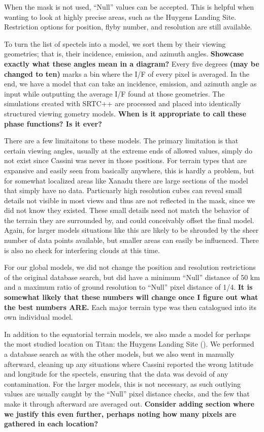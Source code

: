 \documentclass[twocolumn,linenumbers]{aastex631}
\begin{document}
When the mask is not used, ``Null'' values can be accepted. This is helpful when wanting to look at highly precise areas, such as the Huygens Landing Site. Restriction options for position, flyby number, and resolution are still available.

To turn the list of spectels into a model, we sort them by their viewing geometries; that is, their incidence, emission, and azimuth angles.  \textbf{\color{red}Showcase exactly what these angles mean in a diagram?\color{black}} Every five degrees \textbf{\color{red}(may be changed to ten)\color{black}} marks a bin where the I/F of every pixel is averaged. In the end, we have a model that can take an incidence, emission, and azimuth angle as input while outputting the average I/F found at those geometries. The simulations created with SRTC++ are processed and placed into identically structured viewing gometry models.  \textbf{\color{red}When is it appropriate to call these phase functions? Is it ever?\color{black}} 

There are a few limitaitons to these models. The primary limitation is that certain viewing angles, usually at the extreme ends of allowed values, simply do not exist since Cassini was never in those positions. For terrain types that are expansive and easily seen from basically anywhere, this is hardly a problem, but for somewhat localized areas like Xanadu there are large sections of the model that simply have no data. Particuarly high resolution cubes can reveal small details not visible in most views and thus are not reflected in the mask, since we did not know they existed. These small details need not match the behavior of the terrain they are surrounded by, and could conceivably offset the final model. Again, for larger models situations like this are likely to be shrouded by the sheer number of data points available, but smaller areas can easily be influenced. There is also no check for interfering clouds at this time. 

For our global models, we did not change the position and resolution restrictions of the original database search, but did have a minimum ``Null'' distance of 50 km and a maximum ratio of ground resolution to ``Null'' pixel distance of 1/4. \textbf{\color{red}It is somewhat likely that these numbers will change once I figure out what the best numbers ARE.\color{black}}  Each major terrain type was then catalogued into its own individual model. 

In addition to the equatorial terrain models, we also made a model for perhaps the most studied location on Titan: the Huygens Landing Site (). We performed a database search as with the other models, but we also went in manually afterward, cleaning up any situations where Cassini reported the wrong latitude and longitude for the spectels, ensuring that the data was devoid of any contamination. For the larger models, this is not necessary, as such outlying values are usually caught by the ``Null'' pixel distance checks, and the few that make it through afterward are averaged out.  \textbf{\color{red}Consider adding section where we justify this even further, perhaps noting how many pixels are gathered in each location?\color{black}} 
\end{document}
